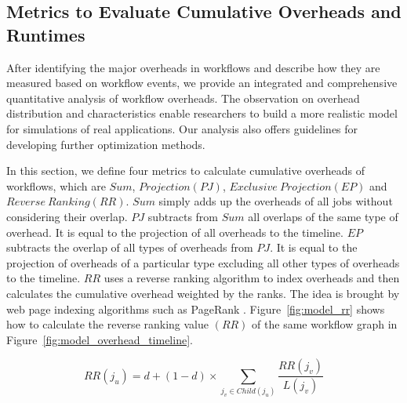 \documentclass[final,5p,times,twocolumn]{elsarticle}
\begin{document}
\subsection{Metrics to Evaluate Cumulative Overheads and Runtimes}

After identifying the major overheads in workflows and describe how they are measured based on workflow events, we provide an integrated and comprehensive quantitative analysis of workflow overheads. The observation on overhead distribution and characteristics enable researchers to build a more realistic model for simulations of real applications. Our analysis also offers guidelines for developing further optimization methods. 


In this section, we define four metrics to calculate cumulative overheads of workflows, which are $Sum$, $Projection(PJ)$, $Exclusive~Projection(EP)$ and $Reverse~Ranking(RR)$. $Sum$ simply adds up the overheads of all jobs without considering their overlap. $PJ$ subtracts from $Sum$ all overlaps of the same type of overhead. It is equal to the projection of all overheads to the timeline. $EP$ subtracts the overlap of all types of overheads from $PJ$. It is equal to the projection of overheads of a particular type excluding all other types of overheads to the timeline.
$RR$ uses a reverse ranking algorithm to index overheads and then calculates the cumulative overhead weighted by the ranks. The idea is brought by web page indexing algorithms such as PageRank \cite{PageRank1999}. Figure~\ref{fig:model_rr} shows how to calculate the reverse ranking value $(RR)$ of the same workflow graph in Figure~\ref{fig:model_overhead_timeline}.
 
\begin{equation} \label{eq:model_rr}
RR(j_u)=d+(1-d)\times\sum_{j_v\in Child(j_u)}{}\frac{RR(j_v)}{L(j_v)}
\end{equation}
\end{document}

